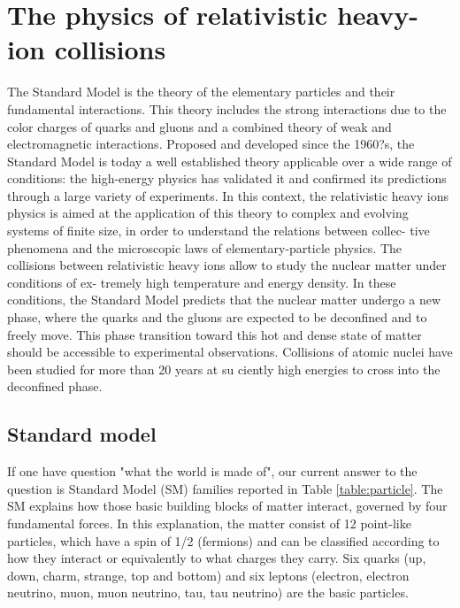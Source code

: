 \section{The physics of relativistic heavy-ion collisions}

The Standard Model is the theory of the elementary particles and their fundamental interactions. This theory includes the strong interactions due to the color charges of quarks and gluons and a combined theory of weak and electromagnetic interactions.
Proposed and developed since the 1960?s, the Standard Model is today a well established theory applicable over a wide range of conditions: the high-energy physics has validated it and confirmed its predictions through a large variety of experiments. In this context, the relativistic heavy ions physics is aimed at the application of this theory to complex and evolving systems of finite size, in order to understand the relations between collec- tive phenomena and the microscopic laws of elementary-particle physics. The collisions between relativistic heavy ions allow to study the nuclear matter under conditions of ex- tremely high temperature and energy density. In these conditions, the Standard Model predicts that the nuclear matter undergo a new phase, where the quarks and the gluons are expected to be deconfined and to freely move.
This phase transition toward this hot and dense state of matter should be accessible to experimental observations. Collisions of atomic nuclei have been studied for more than 20 years at su ciently high energies to cross into the deconfined phase. 

\subsection{Standard model}
If one have question "what the world is made of", our current answer to the question is Standard Model (SM) families \cite{cite:sm} reported in Table \ref{table:particle}. The SM explains how those basic building blocks of matter interact, governed by four fundamental forces. In this explanation, the matter consist of 12 point-like particles, which have a spin of 1/2 (fermions) and can be classified according to how they interact or equivalently to what charges they carry. Six quarks (up, down, charm, strange, top and bottom) and six leptons (electron, electron neutrino, muon, muon neutrino, tau, tau neutrino) are the basic particles.

